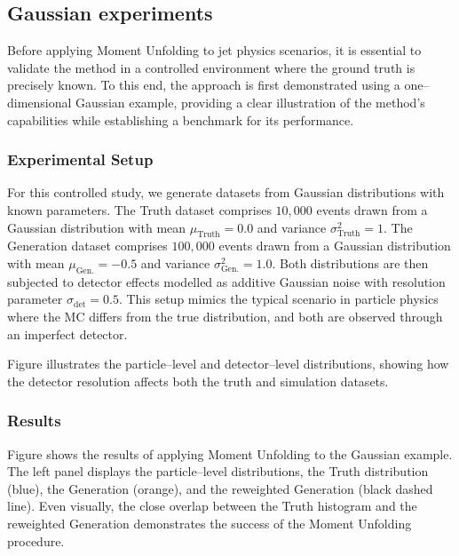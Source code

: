     \subsection{Gaussian experiments}
        Before applying Moment Unfolding to jet physics scenarios, it is essential to validate the method in a controlled environment where the ground truth is precisely known.
        To this end, the approach is first demonstrated using a one--dimensional Gaussian example, providing a clear illustration of the method's capabilities while establishing a benchmark for its performance.
        \subsubsection{Experimental Setup}
            For this controlled study, we generate datasets from Gaussian distributions with known parameters.
            The Truth dataset comprises \(10,000\) events drawn from a Gaussian distribution with mean \(\mu_{\textrm{Truth}} = 0.0\) and variance \(\sigma^2_{\textrm{Truth}} = 1\).
            The Generation dataset comprises \(100,000\) events drawn from a Gaussian distribution with mean $\mu_{\textrm{Gen.}} = -0.5$ and variance $\sigma^2_{\textrm{Gen.}} = 1.0$.
            Both distributions are then subjected to detector effects modelled as additive Gaussian noise with resolution parameter $\sigma_{\textrm{det}} = 0.5$.
            This setup mimics the typical scenario in particle physics where the MC differs from the true distribution, and both are observed through an imperfect detector.

            Figure  illustrates the particle--level and detector--level distributions, showing how the detector resolution affects both the truth and simulation datasets.
        \subsubsection{Results}
            Figure  shows the results of applying Moment Unfolding to the Gaussian example.
            The left panel displays the particle--level distributions, the Truth distribution (blue), the Generation (orange), and the reweighted Generation (black dashed line). 
            Even visually, the close overlap between the Truth histogram and the reweighted Generation demonstrates the success of the Moment Unfolding procedure.

